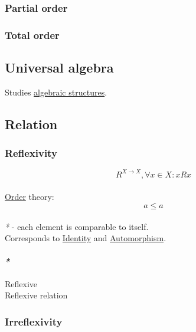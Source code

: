 \documentclass[11pt]{article}
\begin{document}
\subsubsection{\label{orgce8f0bd}Partial order}
\label{sec:org689a1b8}

\subsubsection{\label{org4e2ab13}Total order}
\label{sec:org280a0dd}

\subsection{\label{org5b89945}Universal algebra}
\label{sec:org5ae7234}

Studies \hyperref[orgbade927]{algebraic structures}.\\

\subsection{\label{orgc57ac55}Relation}
\label{sec:org6bee5f4}

\subsubsection{\label{orge2dcddf}Reflexivity}
\label{sec:org482be1c}

$$ R^{X \to X}, \forall x \in X : x R x $$\\
\hyperref[org8544276]{Order} theory: $$ a \le a $$\\

\emph{*} - each element is comparable to itself.\\

Corresponds to \hyperref[org3bbbadd]{Identity} and \hyperref[org32af9c0]{Automorphism}.\\

\paragraph{\emph{*}}
\label{sec:org06d1f3f}

\label{org59bfc97}Reflexive\\
\label{orgd46c363}Reflexive relation\\

\subsubsection{\label{orgdbcd132}Irreflexivity}
\label{sec:org11624c7}
\end{document}
